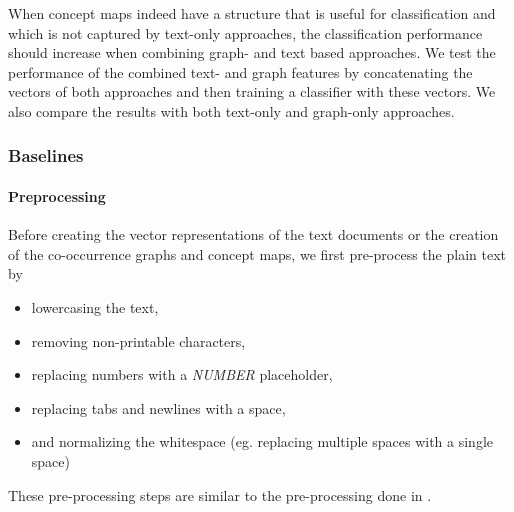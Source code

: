 When concept maps indeed have a structure that is useful for classification and which is not captured by text-only approaches, the classification performance should increase when combining graph- and text based approaches.
We test the performance of the combined text- and graph features by concatenating the vectors of both approaches and then training a classifier with these vectors.
We also compare the results with both text-only and graph-only approaches.

\subsubsection{Baselines}
\paragraph{Preprocessing}
Before creating the vector representations of the text documents or the creation of the co-occurrence graphs and concept maps, we first pre-process the plain text by

\begin{itemize}
\item{lowercasing the text,}
\item{removing non-printable characters,}
\item{replacing numbers with a \textit{NUMBER} placeholder,}
\item{replacing tabs and newlines with a space,}
\item{and normalizing the whitespace (eg. replacing multiple spaces with a single space)}
\end{itemize}
These pre-processing steps are similar to the pre-processing done in \cite{Cachopo2007}.

